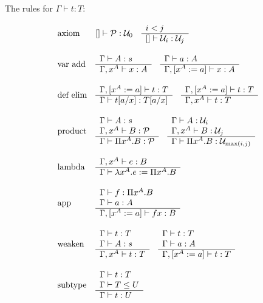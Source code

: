 The rules for $\Gamma \vdash t : T$:

$$
\begin{array}{lllll} 
    \text{axiom} &
    [] \vdash {\cal P}: {\cal U}_0
    \quad
    \begin{array}{l} 
        i < j
     \\ \hline 
        [] \vdash {\cal U}_i : {\cal U}_j
     \end{array}
    \\
    \\
    \text{var add} &
    \begin{array}{l} 
        \Gamma \vdash A: s
     \\ \hline 
        \Gamma, x^A \vdash x: A
     \end{array}
    \quad
    \begin{array}{l} 
        \Gamma \vdash a: A
     \\ \hline 
        \Gamma, [x^A := a] \vdash x: A
     \end{array}
    \\
    \\
    \text{def elim} &
    \begin{array}{l} 
        \Gamma, [x^A:= a] \vdash t : T
     \\ \hline 
        \Gamma \vdash t[a/x] : T[a/x]
     \end{array}
    \quad
    \begin{array}{l} 
        \Gamma, [x^A:= a] \vdash t : T
     \\ \hline 
        \Gamma, x^A \vdash t : T
     \end{array}
    \\
    \\
    \text{product} &
    \begin{array}{l} 
        \Gamma \vdash A: s
        \\
        \Gamma, x^A \vdash B: {\cal P}
     \\ \hline 
        \Gamma \vdash \Pi x^A. B: {\cal P}
     \end{array}
    \quad
    \begin{array}{l} 
        \Gamma \vdash A: {\cal U}_i
        \\
        \Gamma, x^A \vdash B: {\cal U}_j
     \\ \hline 
        \Gamma \vdash \Pi x^A. B: {\cal U}_{\text{max}(i,j)}
     \end{array}
    \\
    \\
    \text{lambda} &
    \begin{array}{l} 
        \Gamma, x^A \vdash e : B
     \\ \hline 
        \Gamma \vdash \lambda x^A. e := \Pi x^A. B
     \end{array}
    \\
    \\
    \text{app} &
    \begin{array}{l} 
        \Gamma \vdash f : \Pi x^A. B
        \\
        \Gamma \vdash a: A
     \\ \hline 
        \Gamma, [x^A := a] \vdash f x: B
     \end{array}
    \\
    \\
    \text{weaken} &
    \begin{array}{l} 
        \Gamma \vdash t: T
        \\
        \Gamma \vdash A: s
     \\ \hline 
        \Gamma, x^A \vdash t : T
     \end{array}
    \quad
    \begin{array}{l} 
        \Gamma \vdash t: T
        \\
        \Gamma \vdash a: A
     \\ \hline 
        \Gamma, [x^A:=a] \vdash t : T
     \end{array}
    \\
    \\
    \text{subtype} &
    \begin{array}{l} 
        \Gamma \vdash t : T
        \\
        \Gamma \vdash T \le U
     \\ \hline 
        \Gamma \vdash t: U
     \end{array}
 \end{array}
$$


